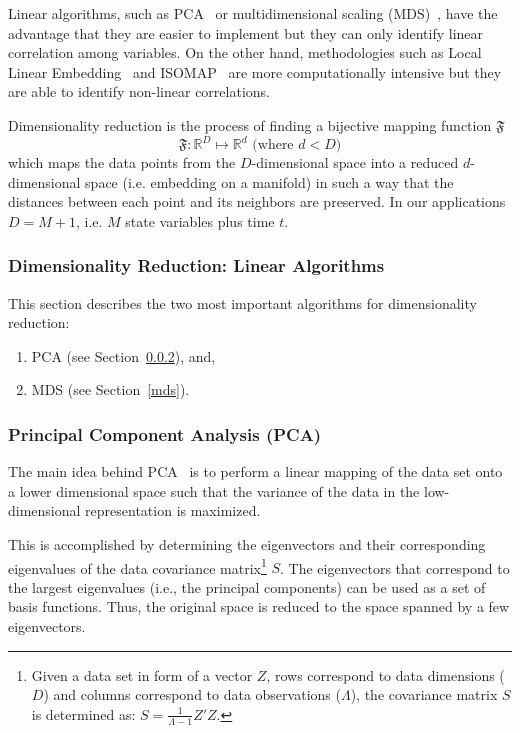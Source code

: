 Linear algorithms, such as PCA~\cite{JolliffePCA} or multidimensional scaling (MDS)~\cite{MDS}, have the advantage that they are easier to implement but they can only identify linear correlation among variables. On the other hand, methodologies such as Local Linear Embedding~\cite{lle} and ISOMAP~\cite{isomap} are more computationally intensive but they are able to identify non-linear correlations.

Dimensionality reduction is the process of finding a bijective mapping function $\mathfrak{F}$
\begin{equation}\label{eq:dimRed}
    \mathfrak{F}:\mathbb{R}^{D}\mapsto\mathbb{R}^{d} \mbox{ (where $d<D$)}
\end{equation}
which maps the data points from the $D$-dimensional space into a reduced $d$-dimensional space (i.e. embedding on a manifold) in such a way that the distances between each point and its neighbors are preserved. In our applications $D = M+1$, i.e. $M$ state variables plus time $t$.


\subsubsection{Dimensionality Reduction: Linear Algorithms}
\label{dimRed}
This section describes the two most important algorithms for dimensionality reduction:
\begin{enumerate}
  \item PCA (see Section~\ref{pca}), and,
  \item MDS (see Section~\ref{mds}).
\end{enumerate}

\subsubsection{Principal Component Analysis (PCA)}
\label{pca}

The main idea behind PCA~\cite{JolliffePCA} is to perform a linear mapping of the data set onto a lower dimensional space such that the variance of the data in the low-dimensional representation is maximized.

This is accomplished by determining the eigenvectors and their corresponding eigenvalues of the data covariance matrix\footnote{Given a data set in form of a vector $Z$, rows correspond to data dimensions ($D$) and columns correspond to data observations ($\Lambda$), the covariance matrix $S$ is determined as: $S=\frac{1}{\Lambda-1}Z'Z$.}
$S$.
The eigenvectors that correspond to the largest eigenvalues (i.e., the principal components) can be used as a set of basis functions. Thus, the original space is reduced to the space spanned by a few eigenvectors.


